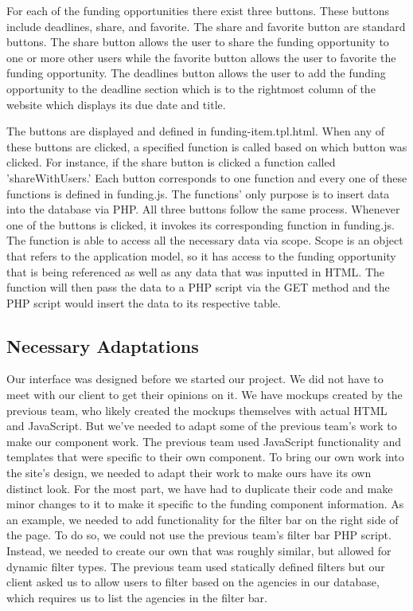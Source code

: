 \documentclass[onecolumn]{IEEEtran}
\begin{document}
For each of the funding opportunities there exist three buttons. These buttons include deadlines, share, and favorite. The share and favorite button are standard buttons. The share button allows the user to share the funding opportunity to one or more other users while the favorite button allows the user to favorite the funding opportunity. The deadlines button allows the user to add the funding opportunity to the deadline section which is to the rightmost column of the website which displays its due date and title. 

The buttons are displayed and defined in funding-item.tpl.html. When any of these buttons are clicked, a specified function is called based on which button was clicked. For instance, if the share button is clicked a function called 'shareWithUsers.' Each button corresponds to one function and every one of these functions is defined in funding.js. The functions' only purpose is to insert data into the database via PHP. All three buttons follow the same process. Whenever one of the buttons is clicked, it invokes its corresponding function in funding.js. The function is able to access all the necessary data via scope. Scope is an object that refers to the application model, so it has access to the funding opportunity that is being referenced as well as any data that was inputted in HTML. The function will then pass the data to a PHP script via the GET method and the PHP script would insert the data to its respective table. 

\subsection{Necessary Adaptations}
Our interface was designed before we started our project. We did not have to meet with our client to get their opinions on it. We have mockups created by the previous team, who likely created the mockups themselves with actual HTML and JavaScript. But we've needed to adapt some of the previous team's work to make our component work. The previous team used JavaScript functionality and templates that were specific to their own component. To bring our own work into the site's design, we needed to adapt their work to make ours have its own distinct look. For the most part, we have had to duplicate their code and make minor changes to it to make it specific to the funding component information. As an example, we needed to add functionality for the filter bar on the right side of the page. To do so, we could not use the previous team's filter bar PHP script. Instead, we needed to create our own that was roughly similar, but allowed for dynamic filter types. The previous team used statically defined filters but our client asked us to allow users to filter based on the agencies in our database, which requires us to list the agencies in the filter bar.
\end{document}
